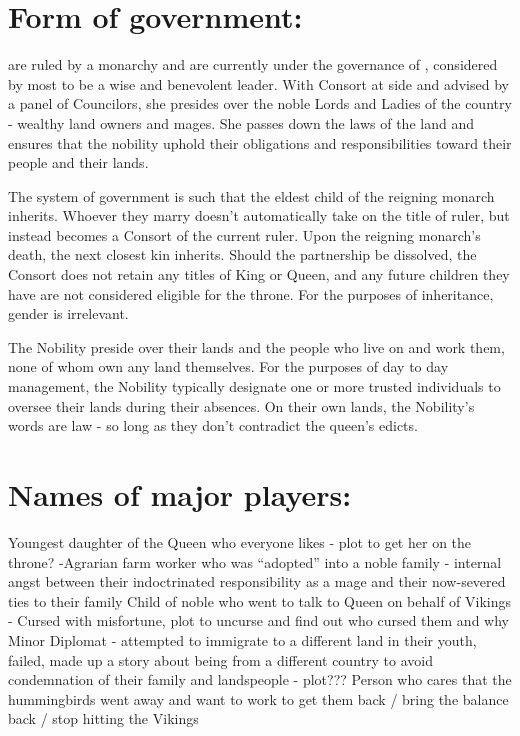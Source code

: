 \documentclass[blue]{GL2020}
\begin{document}
\name{\bAgrarians{}}


\section*{Form of government:}

\pFarm{} are ruled by a monarchy and are currently under the governance of \cQueen{}, considered by most to be a wise and benevolent leader.  With \cQueen{\they} Consort at \cQueen{\their} side and advised by a panel of Councilors, she presides over the noble Lords and Ladies of the country - wealthy land owners and mages.  She passes down the laws of the land and ensures that the nobility uphold their obligations and responsibilities toward their people and their lands.

The system of government is such that the eldest child of the reigning monarch inherits.  Whoever they marry doesn't automatically take on the title of ruler, but instead becomes a Consort of the current ruler.  Upon the reigning monarch's death, the next closest kin inherits.  Should the partnership be dissolved, the Consort does not retain any titles of King or Queen, and any future children they have are not considered eligible for the throne.  For the purposes of inheritance, gender is irrelevant.

The Nobility preside over their lands and the people who live on and work them, none of whom own any land themselves.  For the purposes of day to day management, the Nobility typically designate one or more trusted individuals to oversee their lands during their absences.  On their own lands, the Nobility's words are law - so long as they don't contradict the queen's edicts.


\section*{Names of major players:}

Youngest daughter of the Queen who everyone likes - plot to get her on the throne?
-Agrarian farm worker who was "`adopted"' into a noble family - internal angst between their indoctrinated responsibility as a mage and their now-severed ties to their family
Child of noble who went to talk to Queen on behalf of Vikings - Cursed with misfortune, plot to uncurse and find out who cursed them and why
Minor Diplomat - attempted to immigrate to a different land in their youth, failed, made up a story about being from a different country to avoid condemnation of their family and landspeople - plot???  
Person who cares that the hummingbirds went away and want to work to get them back / bring the balance back / stop hitting the Vikings
\end{document}
